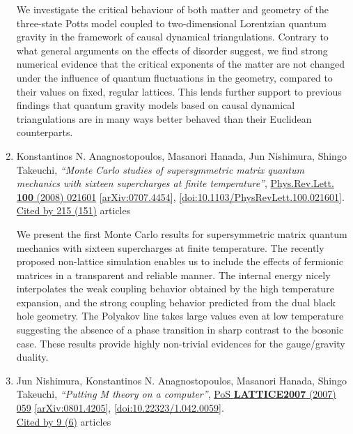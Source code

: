 \documentclass[a4paper,10pt]{article}
\begin{document}
\begin{enumerate}
We investigate the critical behaviour of both matter and geometry of the three-state Potts model coupled to two-dimensional Lorentzian quantum gravity in the framework of causal dynamical triangulations. Contrary to what general arguments on the effects of disorder suggest, we find strong numerical evidence that the critical exponents of the matter are not changed under the influence of quantum fluctuations in the geometry, compared to their values on fixed, regular lattices. This lends further support to previous findings that quantum gravity models based on causal dynamical triangulations are in many ways better behaved than their Euclidean counterparts.
\item Konstantinos N. Anagnostopoulos, Masanori Hanada, Jun Nishimura, Shingo Takeuchi, {\it ``Monte Carlo studies of supersymmetric matrix quantum mechanics with sixteen supercharges at finite temperature''}, \href{https://www.doi.org/10.1103/PhysRevLett.100.021601}{Phys.Rev.Lett. {\bf 100} (2008) 021601} \href{https://arxiv.org/abs/0707.4454}{[arXiv:0707.4454]}, \href{https://www.doi.org/10.1103/PhysRevLett.100.021601}{[doi:10.1103/PhysRevLett.100.021601]}.
\\\href{https://inspirehep.net/literature/?q=refersto%3Arecid%3A756942}{Cited by 215 (151)} articles

We present the first Monte Carlo results for supersymmetric matrix quantum mechanics with sixteen supercharges at finite temperature. The recently proposed non-lattice simulation enables us to include the effects of fermionic matrices in a transparent and reliable manner. The internal energy nicely interpolates the weak coupling behavior obtained by the high temperature expansion, and the strong coupling behavior predicted from the dual black hole geometry. The Polyakov line takes large values even at low temperature suggesting the absence of a phase transition in sharp contrast to the bosonic case. These results provide highly non-trivial evidences for the gauge/gravity duality.
\item Jun Nishimura, Konstantinos N. Anagnostopoulos, Masanori Hanada, Shingo Takeuchi, {\it ``Putting M theory on a computer''}, \href{https://www.doi.org/10.22323/1.042.0059}{PoS {\bf LATTICE2007} (2007) 059} \href{https://arxiv.org/abs/0801.4205}{[arXiv:0801.4205]}, \href{https://www.doi.org/10.22323/1.042.0059}{[doi:10.22323/1.042.0059]}.
\\\href{https://inspirehep.net/literature/?q=refersto%3Arecid%3A778236}{Cited by 9 (6)} articles


\end{enumerate}
\end{document}
